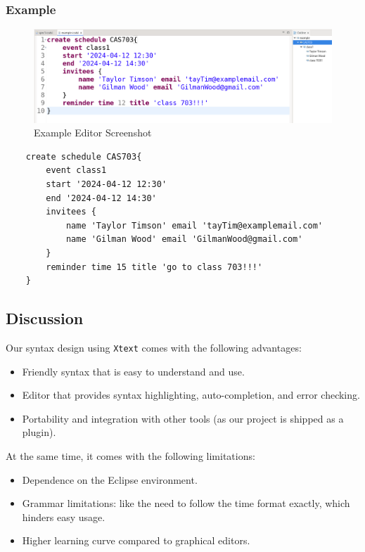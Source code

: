\documentclass[12pt, letterpaper, twoside]{article}
\begin{document}
\subsubsection{Example}
\begin{figure}[H]
    \centering
    \includegraphics[width=1\textwidth]{editor_example.png}
    \caption{Example Editor Screenshot}
    \label{fig:class-diagram}
\end{figure}

\begin{verbatim}
    create schedule CAS703{
        event class1 
        start '2024-04-12 12:30'
        end '2024-04-12 14:30'
        invitees {
            name 'Taylor Timson' email 'tayTim@examplemail.com'
            name 'Gilman Wood' email 'GilmanWood@gmail.com'
        }
        reminder time 15 title 'go to class 703!!!'
    }
\end{verbatim}

\subsection{Discussion}
Our syntax design using \texttt{Xtext} comes with the following advantages:
\begin{itemize}
    \item Friendly syntax that is easy to understand and use.
    \item Editor that provides syntax highlighting, auto-completion, and error checking.
    \item Portability and integration with other tools (as our project is shipped as a plugin). 
\end{itemize}
At the same time, it comes with the following limitations:
\begin{itemize}
    \item Dependence on the Eclipse environment.
    \item Grammar limitations: like the need to follow the time format exactly, which hinders easy usage.
    \item Higher learning curve compared to graphical editors.
\end{itemize}
\end{document}
